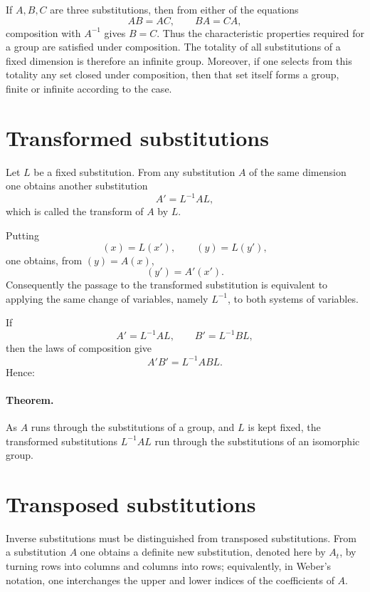 \documentclass[11pt]{article}
\begin{document}
If $A,B,C$ are three substitutions, then from either of the equations
\[
AB=AC,\qquad BA=CA,
\]
composition with $A^{-1}$ gives $B=C$.  Thus the characteristic properties required for a group are satisfied under composition.  The totality of all substitutions of a fixed dimension is therefore an infinite group.  Moreover, if one selects from this totality any set closed under composition, then that set itself forms a group, finite or infinite according to the case.

\section*{Transformed substitutions}
Let $L$ be a fixed substitution.  From any substitution $A$ of the same dimension one obtains another substitution
\begin{equation}\label{eq:weber8-transform}
A'=L^{-1}AL,
\end{equation}
which is called the transform of $A$ by $L$.

Putting
\begin{equation}\label{eq:weber8-variable-transform}
(x)=L(x'),\qquad (y)=L(y'),
\end{equation}
one obtains, from $(y)=A(x)$,
\begin{equation}\label{eq:weber8-transformed-action}
(y')=A'(x').
\end{equation}
Consequently the passage to the transformed substitution is equivalent to applying the same change of variables, namely $L^{-1}$, to both systems of variables.

If
\[
A'=L^{-1}AL,
\qquad
B'=L^{-1}BL,
\]
then the laws of composition give
\[
A'B'=L^{-1}ABL.
\]
Hence:

\paragraph{Theorem.} As $A$ runs through the substitutions of a group, and $L$ is kept fixed, the transformed substitutions $L^{-1}AL$ run through the substitutions of an isomorphic group.

\section*{Transposed substitutions}
Inverse substitutions must be distinguished from transposed substitutions.  From a substitution $A$ one obtains a definite new substitution, denoted here by $A_t$, by turning rows into columns and columns into rows; equivalently, in Weber's notation, one interchanges the upper and lower indices of the coefficients of $A$.
\end{document}
